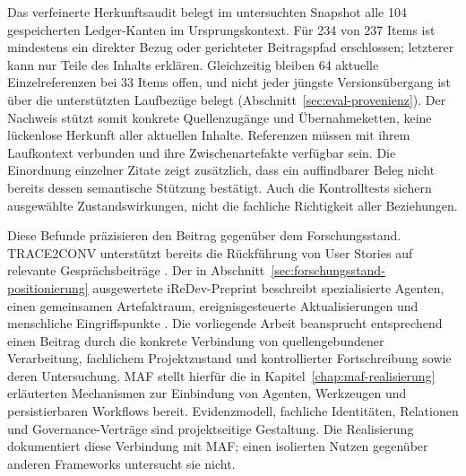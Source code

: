 Das verfeinerte Herkunftsaudit belegt im untersuchten Snapshot alle
104 gespeicherten Ledger-Kanten im Ursprungskontext. Für 234 von
237 Items ist mindestens ein direkter Bezug oder gerichteter
Beitragspfad erschlossen; letzterer kann nur Teile des Inhalts
erklären. Gleichzeitig bleiben 64 aktuelle Einzelreferenzen bei
33 Items offen, und nicht jeder jüngste Versionsübergang ist über
die unterstützten Laufbezüge belegt
(Abschnitt~\ref{sec:eval-provenienz}). Der Nachweis stützt somit
konkrete Quellenzugänge und Übernahmeketten, keine lückenlose
Herkunft aller aktuellen Inhalte. Referenzen müssen mit ihrem
Laufkontext verbunden und ihre Zwischenartefakte verfügbar sein.
Die Einordnung einzelner Zitate zeigt zusätzlich, dass ein
auffindbarer Beleg nicht bereits dessen semantische Stützung
bestätigt. Auch die Kontrolltests sichern ausgewählte
Zustandswirkungen, nicht die fachliche Richtigkeit aller Beziehungen.

Diese Befunde präzisieren den Beitrag gegenüber dem Forschungsstand.
TRACE2CONV unterstützt bereits die Rückführung von User Stories auf
relevante Gesprächsbeiträge \cite[S.~281, 283]{spijkman2022back}.
Der in Abschnitt~\ref{sec:forschungsstand-positionierung} ausgewertete
iReDev-Preprint beschreibt spezialisierte Agenten, einen gemeinsamen
Artefaktraum, ereignisgesteuerte Aktualisierungen und menschliche
Eingriffspunkte \cite[S.~3]{jin2025iredev}.
Die vorliegende Arbeit beansprucht entsprechend einen Beitrag durch die
konkrete Verbindung von quellengebundener Verarbeitung, fachlichem
Projektzustand und kontrollierter Fortschreibung sowie deren Untersuchung.
MAF stellt hierfür die in Kapitel~\ref{chap:maf-realisierung} erläuterten
Mechanismen zur Einbindung von Agenten, Werkzeugen und persistierbaren
Workflows bereit. Evidenzmodell, fachliche Identitäten, Relationen und
Governance-Verträge sind projektseitige Gestaltung. Die Realisierung
dokumentiert diese Verbindung mit MAF; einen isolierten Nutzen gegenüber
anderen Frameworks untersucht sie nicht.
